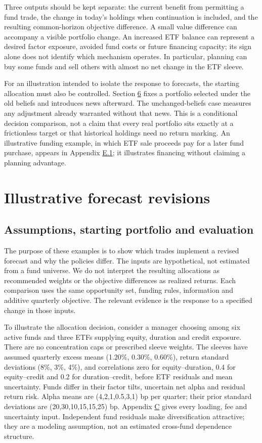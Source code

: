 \documentclass[11pt]{article}
\begin{document}
Three outputs should be kept separate: the current benefit from permitting a fund trade, the change in today's holdings when continuation is included, and the resulting common-horizon objective difference. A small value difference can accompany a visible portfolio change. An increased ETF balance can represent a desired factor exposure, avoided fund costs or future financing capacity; its sign alone does not identify which mechanism operates. In particular, planning can buy some funds and sell others with almost no net change in the ETF sleeve.

For an illustration intended to isolate the response to forecasts, the starting allocation must also be controlled. Section \hyperref[sec:6]{6} fixes a portfolio selected under the old beliefs and introduces news afterward. The unchanged-beliefs case measures any adjustment already warranted without that news. This is a conditional decision comparison, not a claim that every real portfolio sits exactly at a frictionless target or that historical holdings need no return marking. An illustrative funding example, in which ETF sale proceeds pay for a later fund purchase, appears in Appendix \hyperref[sec:E.1]{E.1}; it illustrates financing without claiming a planning advantage.

\section{Illustrative forecast revisions}\label{sec:6}

\subsection{Assumptions, starting portfolio and evaluation}\label{sec:6.1}

The purpose of these examples is to show which trades implement a revised forecast and why the policies differ. The inputs are hypothetical, not estimated from a fund universe. We do not interpret the resulting allocations as recommended weights or the objective differences as realized returns. Each comparison uses the same opportunity set, funding rules, information and additive quarterly objective. The relevant evidence is the response to a specified change in those inputs.

To illustrate the allocation decision, consider a manager choosing among six active funds and three ETFs supplying equity, duration and credit exposure. There are no concentration caps or prescribed sleeve weights. The sleeves have assumed quarterly excess means (1.20\%, 0.30\%, 0.60\%), return standard deviations (8\%, 3\%, 4\%), and correlations zero for equity--duration, 0.4 for equity--credit and 0.2 for duration--credit, before ETF residuals and mean uncertainty. Funds differ in their factor tilts, uncertain net alpha and residual return risk. Alpha means are (4,2,1,0.5,3,1) bp per quarter; their prior standard deviations are (20,30,10,15,15,25) bp. Appendix \hyperref[sec:C]{C} gives every loading, fee and uncertainty input. Independent fund residuals make diversification attractive; they are a modeling assumption, not an estimated cross-fund dependence structure.
\end{document}
